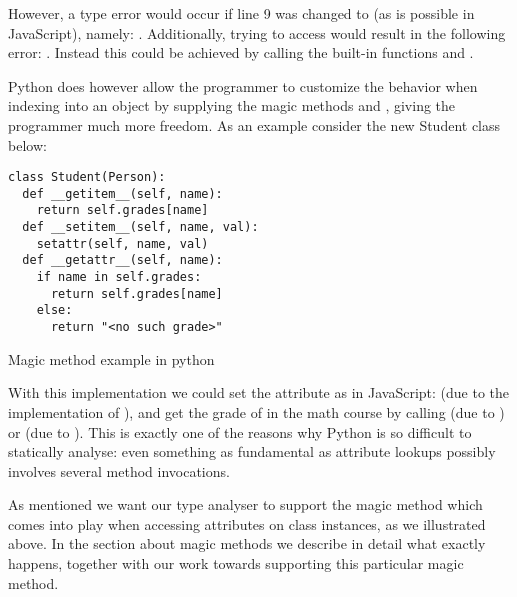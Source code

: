 
However, a type error would occur if line 9 was changed to  (as is possible in JavaScript), namely: 
. Additionally, trying to access  would result in the following error: . Instead this could be achieved by calling the built-in functions  and .

Python does however allow the programmer to customize the behavior when indexing into an object by supplying the magic methods
 and , giving the programmer much more freedom. As an example consider the new Student class below:

\begin{listing}[H]
\begin{verbatim}
class Student(Person):
  def __getitem__(self, name):
    return self.grades[name]
  def __setitem__(self, name, val):
    setattr(self, name, val)
  def __getattr__(self, name):
    if name in self.grades:
      return self.grades[name]
    else:
      return "<no such grade>"
\end{verbatim}
	\caption{Magic method example in python}
	\label{code:Features2}
\end{listing}

With this implementation we could set the  attribute as in JavaScript:  (due to the implementation of ), and get the grade of  in the math course by calling  (due to ) or  (due to ). This is exactly one of the reasons why Python is so difficult to statically analyse: even something as fundamental as attribute lookups possibly involves several method invocations.

As mentioned we want our type analyser to support the magic method  which comes into play when accessing attributes on class instances, as we illustrated above. In the section about magic methods we describe in detail what exactly happens, together with our work towards supporting this particular magic method.